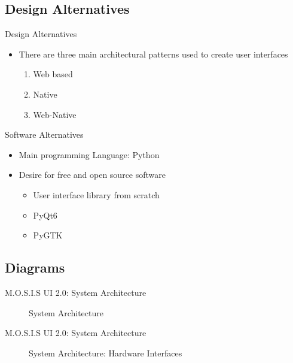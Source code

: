 \documentclass[17pt, aspectratio=169]{beamer}
\begin{document}
\subsection*{Design Alternatives}
\begin{frame}{Design Alternatives}
	\begin{itemize}
		\item There are three main architectural patterns used to create user interfaces
		      \begin{enumerate}
			      \item Web based
			      \item Native
			      \item Web-Native
		      \end{enumerate}
	\end{itemize}
\end{frame}
\begin{frame}{Software Alternatives}
	\begin{itemize}
		\item Main programming Language: Python
		\item Desire for free and open source software
		      \begin{itemize}
			      \item User interface library from scratch
			      \item PyQt6
			      \item PyGTK
		      \end{itemize}
	\end{itemize}
\end{frame}
\subsection*{Diagrams}
\begin{frame}{M.O.S.I.S UI 2.0: System Architecture}
	\begin{figure}
		\caption{System Architecture}
	\end{figure}
\end{frame}
\begin{frame}{M.O.S.I.S UI 2.0: System Architecture}
	\begin{figure}
		\caption{System Architecture: Hardware Interfaces}
	\end{figure}
\end{frame}
\end{document}
